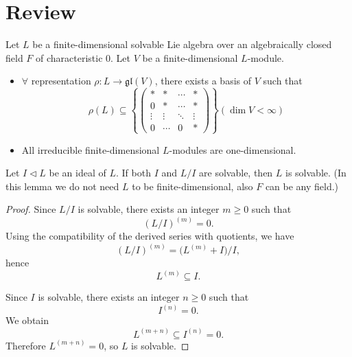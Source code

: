 \section{Review}

Let $L$ be a finite-dimensional solvable Lie algebra over an algebraically closed field $F$ of characteristic 0. Let $V$ be a finite-dimensional $L$-module.

\begin{itemize}
    \item $\forall$ representation $\rho: L \to \mathfrak{gl}(V)$, there exists a basis of $V$ such that
          \[
              \rho(L) \subseteq \left\{
              \begin{pmatrix}
                  *      & *      & \cdots & *      \\
                  0      & *      & \cdots & *      \\
                  \vdots & \vdots & \ddots & \vdots \\
                  0      & \cdots & 0      & *
              \end{pmatrix}
              \right\} (\operatorname{dim}V < \infty)
          \]
    \item All irreducible finite-dimensional $L$-modules are one-dimensional.
\end{itemize}

\begin{lemma}
    Let $I \triangleleft L$ be an ideal of $L$. If both $I$ and $L/I$ are solvable, then $L$ is solvable. (In this lemma we do not need $L$ to be finite-dimensional, also $F$ can be any field.)
\end{lemma}

\begin{proof}
    Since $L/I$ is solvable, there exists an integer $m \ge 0$ such that
    \[
        (L/I)^{(m)}=0.
    \]
    Using the compatibility of the derived series with quotients, we have
    \[
        (L/I)^{(m)} = \bigl(L^{(m)}+I\bigr)/I,
    \]
    hence
    \[
        L^{(m)} \subseteq I.
    \]

    Since $I$ is solvable, there exists an integer $n \ge 0$ such that
    \[
        I^{(n)}=0.
    \]
    We obtain
    \[
        L^{(m+n)} \subseteq I^{(n)}=0.
    \]
    Therefore $L^{(m+n)}=0$, so $L$ is solvable.
\end{proof}

